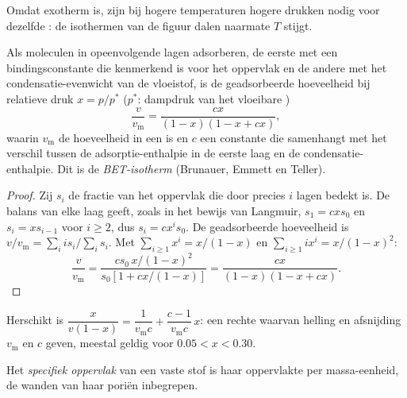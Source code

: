 Omdat  exotherm is, zijn bij hogere temperaturen hogere drukken
nodig voor dezelfde : de isothermen van de figuur dalen
naarmate $T$ stijgt.

\begin{theorem}\label{thm:b3:surfaces-catalysis:bet}
Als moleculen in opeenvolgende lagen adsorberen, de eerste met een
bindingsconstante die kenmerkend is voor het oppervlak en de andere met
het condensatie-evenwicht van de vloeistof, is de geadsorbeerde
hoeveelheid bij relatieve druk $x = p/p^*$ ($p^*$: dampdruk van het
vloeibare )
\[
  \frac{v}{v_{\mathrm m}} = \frac{cx}{(1 - x)(1 - x + cx)},
\]
waarin $v_{\mathrm m}$ de hoeveelheid in een  is en $c$ een
constante die samenhangt met het verschil tussen de adsorptie-enthalpie in
de eerste laag en de condensatie-enthalpie. Dit is de
\emph{BET-isotherm} (Brunauer, Emmett en Teller).
\end{theorem}

\begin{proof}
Zij $s_i$ de fractie van het oppervlak die door precies $i$ lagen bedekt is.
De balans van elke laag geeft, zoals in het bewijs van Langmuir, $s_1 = cxs_0$ en $s_i =
xs_{i-1}$ voor $i \ge 2$, dus $s_i = cx^is_0$. De geadsorbeerde hoeveelheid is $v/v_{\mathrm m} =
\sum_iis_i/\sum_is_i$. Met $\sum_{i\ge1}x^i = x/(1 - x)$ en $\sum_{i\ge1}ix^i = x/(1 - x)^2$:
\[
  \frac{v}{v_{\mathrm m}} = \frac{cs_0\,x/(1 - x)^2}{s_0[1 + cx/(1 - x)]} = \frac{cx}{(1 - x)(1 - x + cx)} .
\]
\end{proof}

Herschikt is $\dfrac{x}{v(1 - x)} = \dfrac{1}{v_{\mathrm m}c} + \dfrac{c - 1}{v_{\mathrm m}c}\,x$: een
rechte waarvan helling en afsnijding $v_{\mathrm m}$ en $c$ geven,
meestal geldig voor $0.05 < x < 0.30$.

\begin{definition}\label{def:b3:surfaces-catalysis:surface-area}
Het \emph{specifiek oppervlak} van een vaste stof
is haar oppervlakte per massa-eenheid, de wanden van haar poriën
inbegrepen.
\end{definition}


